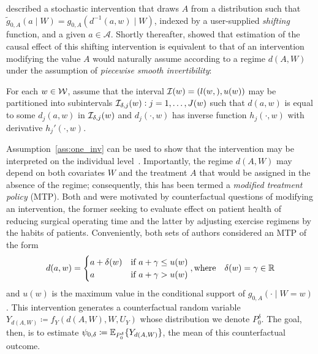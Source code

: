 \citet{diaz2012population} described a stochastic intervention that draws $A$
from a distribution such that $\tilde{g}_{0,A}(a \mid W) = g_{0,A}(d^{-1}(a, w)
\mid W)$, indexed by a user-supplied \textit{shifting} function, and
a given $a \in \mathcal{A}$. Shortly thereafter, \citet{haneuse2013estimation}
showed that estimation of the causal effect of this shifting intervention is
equivalent to that of an intervention modifying the value $A$ would naturally
assume according to a regime $d(A,W)$ under the assumption of
\textit{piecewise smooth invertibility}:
\begin{assumptioniden}\label{ass:one_inv}
  For each $w \in \cal W$, assume that the interval
  ${\cal I}(w) = (l(w,), u(w))$ may be partitioned into subintervals
  ${\cal I}_{\delta,j}(w):j = 1, \ldots, J(w)$ such that $d(a, w)$ is equal to
  some $d_j(a, w)$ in ${\cal I}_{\delta,j}(w)$ and $d_j(\cdot,w)$ has inverse
  function $h_j(\cdot, w)$ with derivative $h_j'(\cdot, w)$.
\end{assumptioniden}
Assumption~\ref{ass:one_inv} can be used to show that the intervention may be
interpreted on the individual level~\citep{young2014identification}.
Importantly, the regime $d(A,W)$ may depend on both covariates $W$ and the
treatment $A$ that would be assigned in the absence of the regime; consequently,
this has been termed a \textit{modified treatment policy} (MTP). Both
\citet{haneuse2013estimation} and \citet{diaz2018stochastic} were motivated by
counterfactual questions of modifying an intervention, the former seeking to
evaluate effect on patient health of reducing surgical operating time and the
latter by adjusting exercise regimens by the habits of patients. Conveniently,
both sets of authors considered an MTP of the form
\begin{equation}\label{eqn:one_defn_shift}
  d(a, w) =
  \begin{cases}
    a + \delta(w) & \text{if } a + \gamma \leq u(w) \\
    a & \text{if } a + \gamma > u(w)
  \end{cases},
  \text{where} \quad \delta(w) = \gamma \in \mathbb{R}
\end{equation}
and $u(w)$ is the maximum value in the conditional support of $g_{0,A}(\cdot
\mid W = w)$. This intervention generates a counterfactual random variable
$Y_{d(A, W)} \coloneqq f_Y(d(A, W), W, U_Y)$ whose distribution we denote
$P_0^{\delta}$. The goal, then, is to estimate $\psi_{0, \delta} \coloneqq
\mathbb{E}_{P_0^{\delta}} \{ Y_{d(A, W)} \}$, the mean of this counterfactual outcome.

